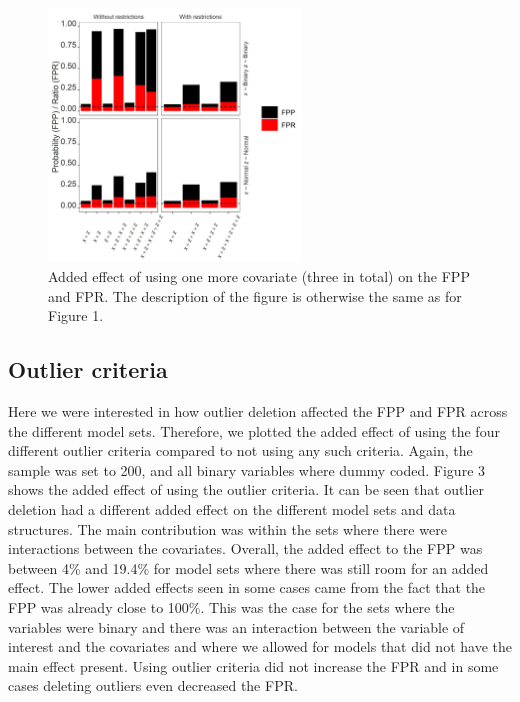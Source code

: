 \begin{figure}[t]
\includegraphics[width=0.6\textwidth]{R/Analysis/Result/Figures/Figure1C.jpeg}
\centering
\caption{Added effect of using one more covariate (three in total) on the FPP and FPR. The description of the figure is otherwise the same as for Figure 1.}
\label{fig:mainfigure}
\end{figure}

\subsection{Outlier criteria}
Here we were interested in how outlier deletion affected the FPP and FPR across the different model sets. Therefore, we plotted the added effect of using the four different outlier criteria compared to not using any such criteria. Again, the sample was set to 200, and all binary variables where dummy coded. Figure 3 shows the added effect of using the outlier criteria. It can be seen that outlier deletion had a different added effect on the different model sets and data structures. The main contribution was within the sets where there were interactions between the covariates. Overall, the added effect to the FPP was between 4\% and 19.4\% for model sets where there was still room for an added effect. The lower added effects seen in some cases came from the fact that the FPP was already close to 100\%. This was the case for the sets where the variables were binary and there was an interaction between the variable of interest and the covariates and where we allowed for models that did not have the main effect present. Using outlier criteria did not increase the FPR and in some cases deleting outliers even decreased the FPR. 

